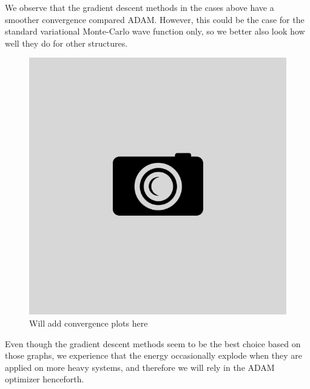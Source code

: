 We observe that the gradient descent methods in the cases above have a smoother convergence compared ADAM. However, this could be the case for the standard variational Monte-Carlo wave function only, so we better also look how well they do for other structures. 

\begin{figure}[H]
	\centering
	\includegraphics[scale=0.3]{Images/example.png}
	\caption{Will add convergence plots here}
\end{figure}

Even though the gradient descent methods seem to be the best choice based on those graphs, we experience that the energy occasionally explode when they are applied on more heavy systems, and therefore we will rely in the ADAM optimizer henceforth. 

